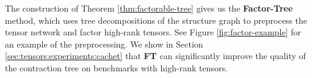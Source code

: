 


The construction of Theorem \ref{thm:factorable-tree} gives us the \textbf{Factor-Tree} method, which uses tree decompositions of the structure graph to preprocess the tensor network and factor high-rank tensors. See Figure \ref{fig:factor-example} for an example of the preprocessing. We show in Section \ref{sec:tensors:experiments:cachet} that \textbf{FT} can significantly improve the quality of the contraction tree on benchmarks with high-rank tensors.